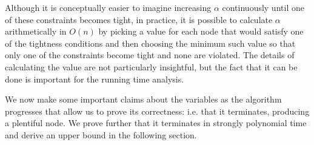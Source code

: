 \documentclass[12pt]{article}
\theoremstyle{definition}
\begin{document}
Although it is conceptually easier to imagine increasing $\alpha$ continuously
until one of these constraints becomes tight, in practice, it is possible to
calculate $\alpha$ arithmetically in $O(n)$ by picking a value for each node
that would satisfy one of the tightness conditions and then choosing the minimum
such value so that only one of the constraints become tight and none are
violated.
The details of calculating the value are not particularly insightful, but the
fact that it can be done is important for the running time analysis.

We now make some important claims about the variables as the algorithm
progresses that allow us to prove its correctness: i.e. that it terminates,
producing a plentiful node.
We prove further that it terminates in strongly polynomial time and derive an upper bound 
in the following section.
\end{document}
